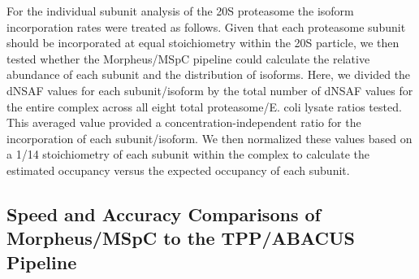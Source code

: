 	For the individual subunit analysis of the 20S proteasome the isoform incorporation rates were treated as follows. Given that each proteasome subunit should be incorporated at equal stoichiometry within the 20S particle, we then tested whether the Morpheus/MSpC pipeline could calculate the relative abundance of each subunit and the distribution of isoforms.  Here, we divided the dNSAF values for each subunit/isoform by the total number of dNSAF values for the entire complex across all eight total proteasome/E. coli lysate ratios tested.  This averaged value provided a concentration-independent ratio for the incorporation of each subunit/isoform.  We then normalized these values based on a 1/14 stoichiometry of each subunit within the complex to calculate the estimated occupancy versus the expected occupancy of each subunit.  

\subsection{Speed and Accuracy Comparisons of Morpheus/MSpC to the TPP/ABACUS Pipeline}

